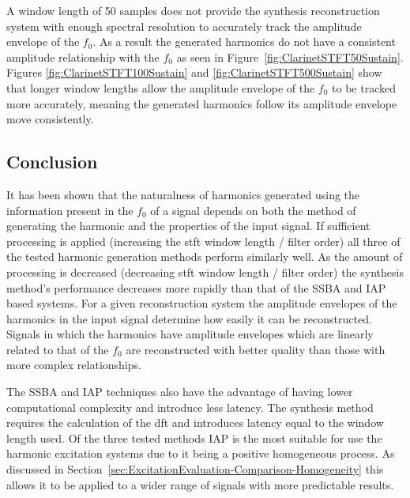 		A window length of 50 samples does not provide the synthesis reconstruction system with enough spectral
		resolution to accurately track the amplitude envelope of the $f_{0}$. As a result the generated harmonics
		do not have a consistent amplitude relationship with the $f_{0}$ as seen in
		Figure~\ref{fig:ClarinetSTFT50Sustain}. Figures \ref{fig:ClarinetSTFT100Sustain} and
		\ref{fig:ClarinetSTFT500Sustain} show that longer window lengths allow the amplitude envelope of the
		$f_{0}$ to be tracked more accurately, meaning the generated harmonics follow its amplitude envelope move
		consistently.
		
	\subsection{Conclusion}
	\label{sec:PerceptualExperiments-Reconstruction-Conclusion}
		It has been shown that the naturalness of harmonics generated using the information present in the $f_{0}$
		of a signal depends on both the method of generating the harmonic and the properties of the input signal.
		If sufficient processing is applied (increasing the \acrshort{stft} window length / filter order) all three
		of the tested harmonic generation methods perform similarly well. As the amount of processing is decreased
		(decreasing \acrshort{stft} window length / filter order) the synthesis method's performance decreases more
		rapidly than that of the SSBA and IAP based systems. For a given reconstruction system the amplitude
		envelopes of the harmonics in the input signal determine how easily it can be reconstructed. Signals in
		which the harmonics have amplitude envelopes which are linearly related to that of the $f_{0}$ are
		reconstructed with better quality than those with more complex relationships.
		
		The SSBA and IAP techniques also have the advantage of having lower computational complexity and introduce
		less latency. The synthesis method requires the calculation of the \acrshort{dft} and introduces latency
		equal to the window length used. Of the three tested methods IAP is the most suitable for use the harmonic
		excitation systems due to it being a positive homogeneous process. As discussed in
		Section~\ref{sec:ExcitationEvaluation-Comparison-Homogeneity} this allows it to be applied to a wider range
		of signals with more predictable results.


